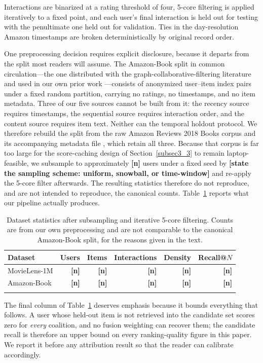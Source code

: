\documentclass[pdflatex,sn-mathphys-num]{sn-jnl}%
\theoremstyle{thmstyleone}%
\theoremstyle{thmstyletwo}%
\theoremstyle{thmstylethree}%
\newcommand{\tbd}[1]{\textbf{[#1]}}
\begin{document}
Interactions are binarized at a rating threshold of four, 5-core filtering is applied iteratively to a fixed point, and each user's final interaction is held out for testing with the penultimate one held out for validation. Ties in the day-resolution Amazon timestamps are broken deterministically by original record order.

One preprocessing decision requires explicit disclosure, because it departs from the split most readers will assume. The Amazon-Book split in common circulation---the one distributed with the graph-collaborative-filtering literature and used in our own prior work \cite{louhichi2026}---consists of anonymized user--item index pairs under a fixed random partition, carrying no ratings, no timestamps, and no item metadata. Three of our five sources cannot be built from it: the recency source requires timestamps, the sequential source requires interaction order, and the content source requires item text. Neither can the temporal holdout protocol. We therefore rebuild the split from the raw Amazon Reviews 2018 Books corpus and its accompanying metadata file \cite{ni2019}, which retain all three. Because that corpus is far too large for the score-caching design of Section~\ref{subsec3_3} to remain laptop-feasible, we subsample to approximately \tbd{n} users under a fixed seed by \tbd{state the sampling scheme: uniform, snowball, or time-window} and re-apply the 5-core filter afterwards. The resulting statistics therefore do not reproduce, and are not intended to reproduce, the canonical counts. Table~\ref{tab2} reports what our pipeline actually produces.

\begin{table}[t]
\caption{Dataset statistics after subsampling and iterative 5-core filtering. Counts are from our own preprocessing and are not comparable to the canonical Amazon-Book split, for the reasons given in the text.}\label{tab2}
\begin{tabular}{@{}lrrrrr@{}}
\toprule
Dataset & Users & Items & Interactions & Density & Recall@$N$ \\
\midrule
MovieLens-1M   & \tbd{n} & \tbd{n} & \tbd{n} & \tbd{n} & \tbd{n} \\
Amazon-Book    & \tbd{n} & \tbd{n} & \tbd{n} & \tbd{n} & \tbd{n} \\
\botrule
\end{tabular}
\end{table}

The final column of Table~\ref{tab2} deserves emphasis because it bounds everything that follows. A user whose held-out item is not retrieved into the candidate set scores zero for \emph{every} coalition, and no fusion weighting can recover them; the candidate recall is therefore an upper bound on every ranking-quality figure in this paper. We report it before any attribution result so that the reader can calibrate accordingly.
\end{document}
